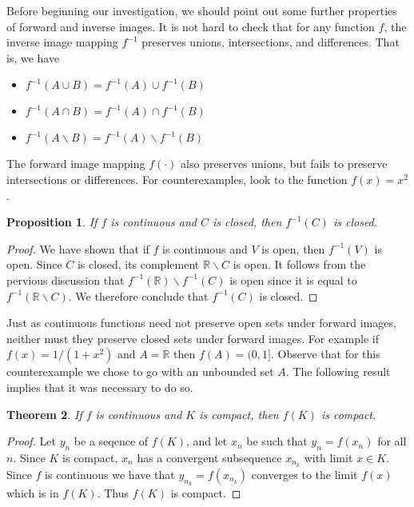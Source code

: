 \documentclass[11pt,oneside]{amsbook}
\newcommand{\R}{\mathbb R}
\renewcommand{\setminus}{\smallsetminus}
\theoremstyle{definition}
\theoremstyle{plain}
\newtheorem{theorem}{Theorem}[section]
\newtheorem{proposition}[theorem]{Proposition}
\theoremstyle{definition}
\theoremstyle{remark}
\numberwithin{equation}{section}
\numberwithin{figure}{section}
\begin{document}
Before beginning our investigation, we should point out some further properties of forward and inverse images. It is not hard to check that for any function $f$, the inverse image mapping $f^{-1}$ preserves unions, intersections, and differences. That is, we have
\begin{itemize}
\item $f^{-1}(A\cup B)=f^{-1}(A)\cup f^{-1}(B)$
\item $f^{-1}(A\cap B)=f^{-1}(A)\cap f^{-1}(B)$
\item $f^{-1}(A\setminus B)=f^{-1}(A)\setminus f^{-1}(B)$
\end{itemize}
The forward image mapping $f(\cdot)$ also preserves unions, but fails to preserve intersections or differences. For counterexamples, look to the function $f(x)=x^2$.

\begin{proposition}
  If $f$ is continuous and $C$ is closed, then $f^{-1}(C)$ is closed.
\end{proposition}

\begin{proof}
  We have shown that if $f$ is continuous and $V$ is open, then $f^{-1}(V)$ is open. Since $C$ is closed, its complement $\R\setminus C$ is open. It follows from the pervious discussion that $f^{-1}(\R)\setminus f^{-1}(C)$ is open since it is equal to $f^{-1}(\R\setminus C)$. We therefore conclude that $f^{-1}(C)$ is closed.
\end{proof}

Just as continuous functions need not preserve open sets under forward images, neither must they preserve closed sets under forward images. For example if $f(x)=1/(1+x^2)$ and $A=\R$ then $f(A)=(0,1]$. Observe that for this counterexample we chose to go with an unbounded set $A$. The following result implies that it was necessary to do so.

\begin{theorem}
  If $f$ is continuous and $K$ is compact, then $f(K)$ is compact.
\end{theorem}

\begin{proof}
  Let $y_n$ be a seqence of $f(K)$, and let $x_n$ be such that $y_n=f(x_n)$ for all $n$. Since $K$ is compact, $x_n$ has a convergent subsequence $x_{n_k}$ with limit $x\in K$. Since $f$ is continuous we have that $y_{n_k}=f(x_{n_k})$ converges to the limit $f(x)$ which is in $f(K)$. Thus $f(K)$ is compact.
\end{proof}
\end{document}
